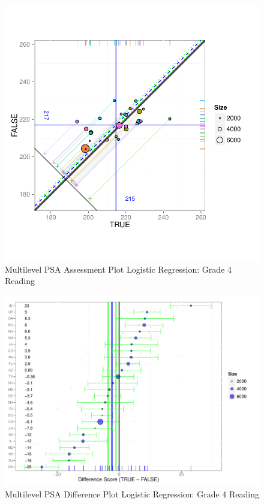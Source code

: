 \begin{figure}[h!]
\begin{center}
\includegraphics[width=\textwidth]{../Figures2009/g4read-mlpsa-lr-circ.pdf}
\caption{Multilevel PSA Assessment Plot Logistic Regression: Grade 4 Reading}
\end{center}
\end{figure}

\begin{figure}[h!]
\begin{center}
\includegraphics[width=\textwidth]{../Figures2009/g4read-mlpsa-lr-diff.pdf}
\caption{Multilevel PSA Difference Plot Logistic Regression: Grade 4 Reading}
\end{center}
\end{figure}

